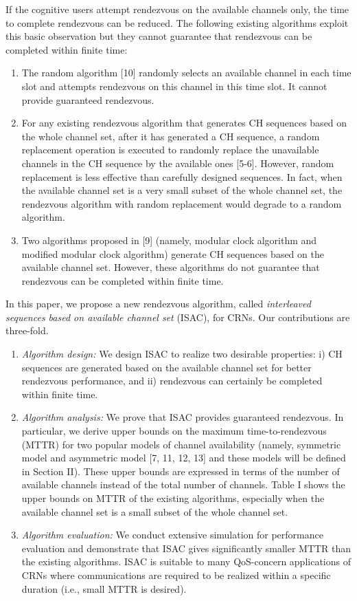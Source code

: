 \documentclass[journal]{IEEEtran}
\begin{document}
\par If the cognitive users attempt rendezvous on the available channels only, the time to complete rendezvous can be reduced. The following existing algorithms exploit this basic observation but they cannot guarantee that rendezvous can be completed within finite time:
\begin{enumerate}
\item The random algorithm [10] randomly selects an available channel in each time slot and attempts rendezvous on this channel in this time slot. It cannot provide guaranteed rendezvous.
\item For any existing rendezvous algorithm that generates CH sequences based on the whole channel set, after it has generated a CH sequence, a random replacement operation is executed to randomly replace the unavailable channels in the CH sequence by the available ones [5-6]. However, random replacement is less effective than carefully designed sequences. In fact, when the available channel set is a very small subset of the whole channel set, the rendezvous algorithm with random replacement would degrade to a random algorithm.
\item Two algorithms proposed in [9] (namely, modular clock algorithm and modified modular clock algorithm) generate CH sequences based on the available channel set. However, these algorithms do not guarantee that rendezvous can be completed within finite time.
\end{enumerate}
\par In this paper, we propose a new rendezvous algorithm, called \emph{interleaved sequences based on available channel set} (ISAC), for CRNs. Our contributions are three-fold.
\begin{enumerate}
\item \emph{Algorithm design:} We design ISAC to realize two desirable properties: i) CH sequences are generated based on the available channel set for better rendezvous performance, and ii) rendezvous can certainly be completed within finite time.
\item \emph{Algorithm analysis:} We prove that ISAC provides guaranteed rendezvous. In particular, we derive upper bounds on the maximum time-to-rendezvous (MTTR) for two popular models of channel availability (namely, symmetric model and asymmetric model [7, 11, 12, 13] and these models will be defined in Section II). These upper bounds are expressed in terms of the number of available channels instead of the total number of channels. Table I shows the upper bounds on MTTR of the existing algorithms, especially when the available channel set is a small subset of the whole channel set.
\item \emph{Algorithm evaluation:} We conduct extensive simulation for performance evaluation and demonstrate that ISAC gives significantly smaller MTTR than the existing algorithms. ISAC is suitable to many QoS-concern applications of CRNs where communications are required to be realized within a specific duration (i.e., small MTTR is desired).
\end{enumerate}
\end{document}
